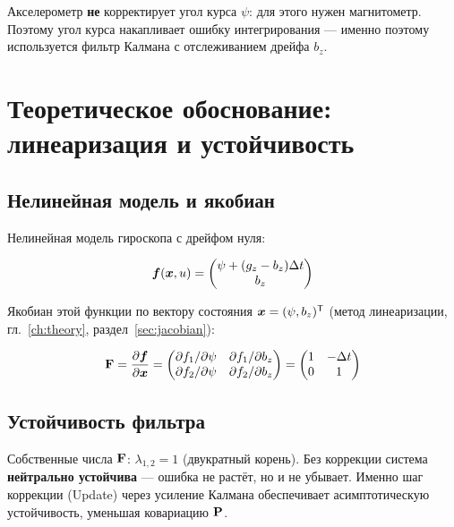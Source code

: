 \begin{notebox}
Акселерометр \textbf{не} корректирует угол курса $\psi$: для этого нужен
магнитометр. Поэтому угол курса накапливает ошибку интегрирования ---
именно поэтому используется фильтр Калмана с отслеживанием дрейфа $b_z$.
\end{notebox}

\section{Теоретическое обоснование: линеаризация и устойчивость}

\subsection{Нелинейная модель и якобиан}

Нелинейная модель гироскопа с дрейфом нуля:

\begin{equation}
  \bm{f}(\bm{x}, u) = \begin{pmatrix} \psi + (g_z - b_z)\Delta t \\ b_z \end{pmatrix}
  \label{eq:imu_nonlinear}
\end{equation}

Якобиан этой функции по вектору состояния $\bm{x} = (\psi, b_z)^{\mathsf{T}}$
(метод линеаризации, гл.~\ref{ch:theory}, раздел~\ref{sec:jacobian}):

\begin{equation}
  \mathbf{F} = \frac{\partial \bm{f}}{\partial \bm{x}} =
  \begin{pmatrix}
    \partial f_1/\partial\psi & \partial f_1/\partial b_z \\
    \partial f_2/\partial\psi & \partial f_2/\partial b_z
  \end{pmatrix}
  = \begin{pmatrix} 1 & -\Delta t \\ 0 & 1 \end{pmatrix}
  \label{eq:imu_jacobian}
\end{equation}

\subsection{Устойчивость фильтра}

Собственные числа $\mathbf{F}$: $\lambda_{1,2} = 1$ (двукратный корень).
Без коррекции система \textbf{нейтрально устойчива} --- ошибка не растёт,
но и не убывает. Именно шаг коррекции (Update) через усиление Калмана
обеспечивает асимптотическую устойчивость, уменьшая ковариацию $\mathbf{P}$.

